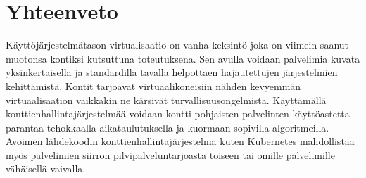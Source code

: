 \documentclass[finnish,gradu]{tktltiki3}
\begin{document}
\section{Yhteenveto}

Käyttöjärjestelmätason virtualisaatio on vanha keksintö joka on viimein saanut muotonsa kontiksi kutsuttuna toteutuksena. Sen avulla voidaan palvelimia kuvata yksinkertaisella ja standardilla tavalla helpottaen hajautettujen järjestelmien kehittämistä. Kontit tarjoavat virtuaalikoneisiin nähden kevyemmän virtuaalisaation vaikkakin ne kärsivät turvallisuusongelmista. Käyttämällä konttienhallintajärjestelmää voidaan kontti-pohjaisten palvelinten käyttöastetta parantaa tehokkaalla aikataulutuksella ja kuormaan sopivilla algoritmeilla. Avoimen lähdekoodin konttienhallintajärjestelmä kuten Kubernetes mahdollistaa myös palvelimien siirron pilvipalveluntarjoasta toiseen tai omille palvelimille vähäisellä vaivalla.

\nocite{*}






%
%
%


%


% 


\lastpage

\appendices

\pagestyle{empty}
\end{document}
